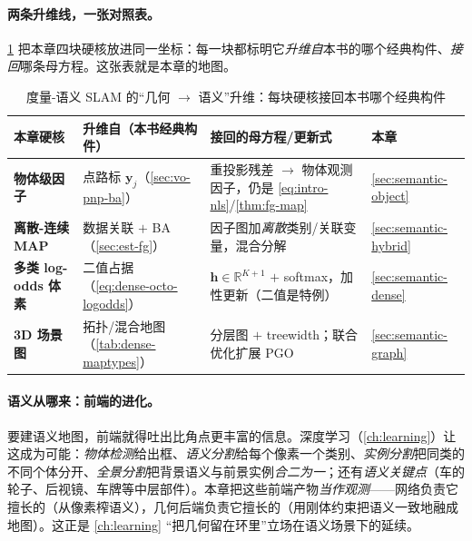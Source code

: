 \paragraph{两条升维线，一张对照表。}
\cref{tab:semantic-lift} 把本章四块硬核放进同一坐标：每一块都标明它\emph{升维自}本书的哪个经典构件、\emph{接回}哪条母方程。这张表就是本章的地图。

\begin{table}[H]\centering\small
\caption{度量-语义 SLAM 的“几何 $\to$ 语义”升维：每块硬核接回本书哪个经典构件}
\label{tab:semantic-lift}
\begin{tabular}{p{} p{} p{} p{}}
\toprule
本章硬核 & 升维自（本书经典构件） & 接回的母方程/更新式 & 本章 \\
\midrule
\textbf{物体级因子} & 点路标 $\mathbf{y}_j$（\cref{sec:vo-pnp-ba}） & 重投影残差 $\to$ 物体观测因子，仍是 \cref{eq:intro-nls}/\cref{thm:fg-map} & \cref{sec:semantic-object} \\
\textbf{离散-连续 MAP} & 数据关联 $+$ BA（\cref{sec:est-fg}） & 因子图加\emph{离散}类别/关联变量，混合分解 & \cref{sec:semantic-hybrid} \\
\textbf{多类 log-odds 体素} & 二值占据（\cref{eq:dense-octo-logodds}） & $\mathbf{h}\in\mathbb{R}^{K+1}$ $+$ softmax，加性更新（二值是特例） & \cref{sec:semantic-dense} \\
\textbf{3D 场景图} & 拓扑/混合地图（\cref{tab:dense-maptypes}） & 分层图 $+$ treewidth；联合优化扩展 PGO & \cref{sec:semantic-graph} \\
\bottomrule
\end{tabular}
\end{table}

\paragraph{语义从哪来：前端的进化。}
要建语义地图，前端就得吐出比角点更丰富的信息\cite{carlone2026handbook}。深度学习（\cref{ch:learning}）让这成为可能：\emph{物体检测}给出框、\emph{语义分割}给每个像素一个类别\cite{long2015fcn}、\emph{实例分割}把同类的不同个体分开\cite{he2017maskrcnn}、\emph{全景分割}把背景语义与前景实例\emph{合二为一}\cite{kirillov2019panoptic}；还有\emph{语义关键点}\cite{pavlakos2017semantickeypoints}（车的轮子、后视镜、车牌等中层部件）。本章把这些前端产物\emph{当作观测}——网络负责它擅长的（从像素榨语义），几何后端负责它擅长的（用刚体约束把语义一致地融成地图）。这正是 \cref{ch:learning} “把几何留在环里”立场在语义场景下的延续。

